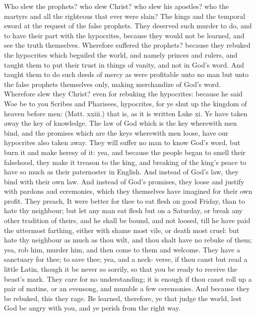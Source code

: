 Who slew the prophets? who slew Christ? who slew his 
apostles? who the martyrs and all the righteous that ever 
were slain? The kings and the temporal sword at the request
of the false prophets. They deserved such murder 
to do, and to have their part with the hypocrites, because 
they would not be learned, and see the truth themselves. 
Wherefore suffered the prophets? because they rebuked 
the hypocrites which beguiled the world, and namely princes
and rulers, and taught them to put their trust in things 
of vanity, and not in God's word. And taught them to do 
such deeds of mercy as were profitable unto no man but 
unto the false prophets themselves only, making merchandize
of God's word. Wherefore slew they Christ? even 
for rebuking the hypocrites: because he said Woe be to 
you Scribes and Pharisees, hypocrites, for ye shut up the 
kingdom of heaven before men: (Matt. xxiii.) that is, as it 
is written Luke xi. Ye have taken away the key of knowledge.
The law of God which is the key wherewith men 
bind, and the promises which are the keys wherewith 
men loose, have our hypocrites also taken away. They 
will suffer no man to know God's word, but burn it and 
make heresy of it: yea, and because the people began to 
smell their falsehood, they make it treason to the king, and 
breaking of the king's peace to have so much as their paternoster
in English. And instead of God's law, they bind 
with their own law. And instead of God's promises, they 
loose and justify with pardons aud ceremonies, which 
they themselves have imagined for their own profit. They 
preach, It were better for thee to eat flesh on good Friday, 
than to hate thy neighbour; but let any man eat flesh but 
on a Saturday, or break any other tradition of theirs, and 
he shall be bound, and not loosed, till he have paid the 
uttermost farthing, either with shame most vile, or death 
most cruel: but hate thy neighbour as much as thou wilt, 
and thou shalt have no rebuke of them; yea, rob him, 
murder him, and then come to them and welcome. They 
have a sanctuary for thee; to save thee; yea, and a neck- 
verse, if thou canst but read a little Latin, though 
it be never so sorrily, so that you be ready to receive the 
beast's mark. They care for no understanding; it is 
enough if thou canst roll up a pair of matins, or an evensong,
and mumble a few ceremonies. And because they 
be rebuked, this they rage. Be learned, therefore, ye 
that judge the world, lest God be angry with you, and ye 
perish from the right way. 

